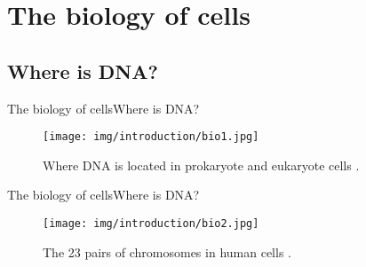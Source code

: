 \documentclass[10pt]{beamer}
\newcommand{\1}{
	\setbeamertemplate{background}{
		\texttt{[image: img/1]}
		\tikz[overlay] \fill[fill opacity=0.75,fill=white] (0,0) rectangle (-\paperwidth,\paperheight);
	}
}
\begin{document}
\section{The biology of cells}




\subsection{Where is DNA?}

\begin{frame}{The biology of cells}{Where is DNA?}
\begin{figure}[]
 \centering
    \texttt{[image: img/introduction/bio1.jpg]}
    \label{img:mot2}
    \caption{Where DNA is located in prokaryote and eukaryote cells \cite{archibald2018genomics}.}
\end{figure}
\end{frame}


\begin{frame}{The biology of cells}{Where is DNA?}
\begin{figure}[]
 \centering
    \texttt{[image: img/introduction/bio2.jpg]}
    \label{img:mot2}
    \caption{The 23 pairs of chromosomes in human cells \cite{archibald2018genomics}.}
\end{figure}
\end{frame}
\end{document}
